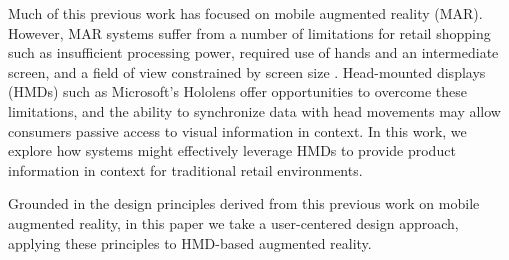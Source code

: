 Much of this previous work has focused on mobile augmented reality (MAR). However, MAR systems suffer from a number of limitations for retail shopping such as insufficient processing power, required use of hands and an intermediate screen, and a field of view constrained by screen size \cite{bimber2005spatial}. Head-mounted displays (HMDs) such as Microsoft's Hololens offer opportunities to overcome these limitations, and the ability to synchronize data with head movements may allow consumers passive access to visual information in context. In this work, we explore how systems might effectively leverage HMDs to provide product information in context for traditional retail environments. 


Grounded in the design principles derived from this previous work on mobile augmented reality, in this paper we take a user-centered design approach, applying these principles to HMD-based augmented reality.

